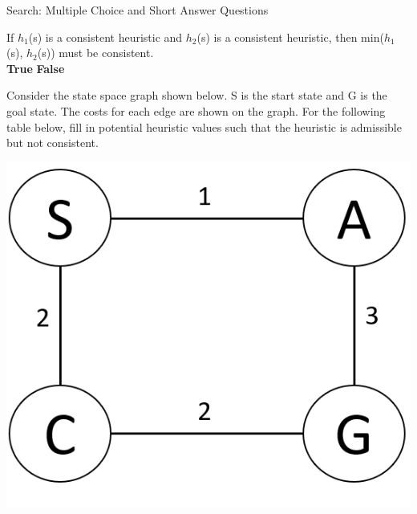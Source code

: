\begin{problem}{Search: Multiple Choice and Short Answer Questions}
\begin{question}[12]
\vspace{2mm}
\hspace{0.5mm}
If $h_{1}$(s) is a consistent heuristic and $h_{2}$(s) is a consistent heuristic, then min($h_{1}$(s), $h_{2}$(s)) must be consistent. \\
\solution{\emptycircle}{\FourAFTrue} \textbf{True}
\hspace{5mm}
\solution{\emptycircle}{\FourAFFalse} \textbf{False} \\
\solution{}{\FourAFReason}
\end{question} 
\vspace{2mm}

\begin{question}[5] 
Consider the state space graph shown below. S is the start state and G is the goal state. The costs for each edge are shown on the graph. For the following table below, fill in potential heuristic values such that the heuristic is admissible but not consistent. 

\vspace{10mm}
\begin{centering} 
\hspace{10mm}
\includegraphics[scale=.6]{figures/Consistent.png} 
\end{centering}

\solution{}{\FourBReason}

\end{question}

\end{problem}